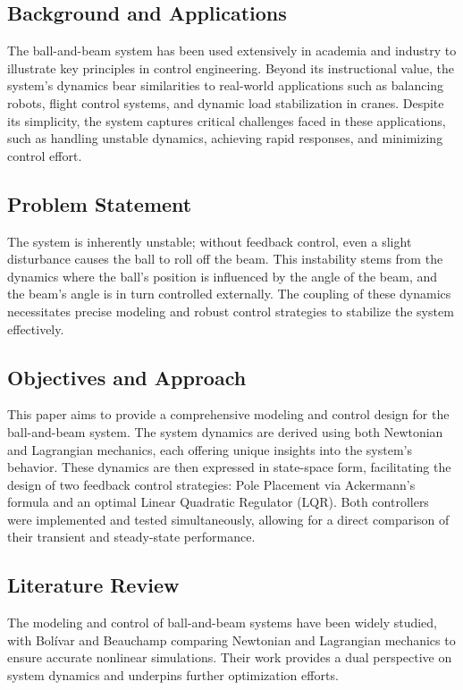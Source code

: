 \documentclass[conference]{IEEEtran}
\begin{document}
\subsection{Background and Applications}
\label{subsec:background}
The ball-and-beam system has been used extensively in academia and industry to illustrate key principles in control engineering. Beyond its instructional value, the system's dynamics bear similarities to real-world applications such as balancing robots, flight control systems, and dynamic load stabilization in cranes. Despite its simplicity, the system captures critical challenges faced in these applications, such as handling unstable dynamics, achieving rapid responses, and minimizing control effort.

\subsection{Problem Statement}
\label{subsec:intro_prob_statement}
The system is inherently unstable; without feedback control, even a slight disturbance causes the ball to roll off the beam. This instability stems from the dynamics where the ball's position is influenced by the angle of the beam, and the beam's angle is in turn controlled externally. The coupling of these dynamics necessitates precise modeling and robust control strategies to stabilize the system effectively.

\subsection{Objectives and Approach}
\label{subsec:intro_objective}
This paper aims to provide a comprehensive modeling and control design for the ball-and-beam system. The system dynamics are derived using both Newtonian and Lagrangian mechanics, each offering unique insights into the system's behavior. These dynamics are then expressed in state-space form, facilitating the design of two feedback control strategies: Pole Placement via Ackermann’s formula and an optimal Linear Quadratic Regulator (LQR). Both controllers were implemented and tested simultaneously, allowing for a direct comparison of their transient and steady-state performance.

\subsection{Literature Review}
\label{subsec:intro_lit_review}
The modeling and control of ball-and-beam systems have been widely studied, with Bolívar and Beauchamp \cite{bolivar2014} comparing Newtonian and Lagrangian mechanics to ensure accurate nonlinear simulations. Their work provides a dual perspective on system dynamics and underpins further optimization efforts. 
\end{document}
